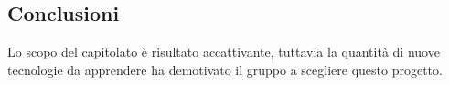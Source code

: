 \subsection{Conclusioni}
Lo scopo del capitolato è risultato accattivante, tuttavia la quantità di nuove tecnologie da apprendere ha demotivato il gruppo a scegliere questo progetto.